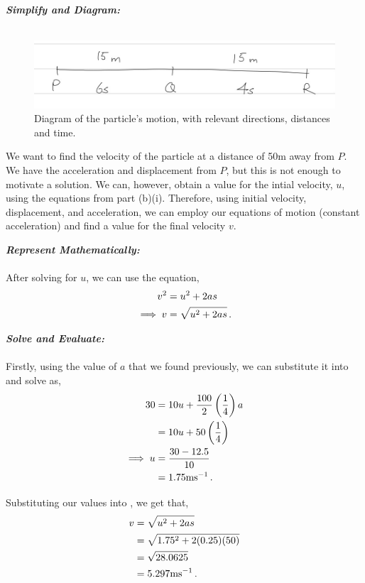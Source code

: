 \begin{subquestions}
\begin{subsubquestions}
\subsubquestion
\textbf{\textit{Simplify and Diagram:}} \\ \\
\begin{figure}[H]
	\begin{center}
		\includegraphics[scale=0.5]{../2010/figures/2010q5-2}
		\caption{\label{2010:q5:Move6} Diagram of the particle's motion, with relevant directions, distances and time.}
	\end{center}
\end{figure}
We want to find the velocity of the particle at a distance of 50m away from $P$. We have the acceleration and displacement from $P$, but this is not enough to motivate a solution. We can, however, obtain a value for the intial velocity, $u$, using the equations from part (b)(i). Therefore, using initial velocity, displacement, and acceleration, we can employ our equations of motion (constant acceleration) and find a value for the final velocity $v$.




\textbf{\textit{Represent Mathematically:}} \\ \\
After solving for $u$, we can use the equation,
\begin{align}
	v^2 & = u^2 + 2as \nonumber \\
	\implies v & = \sqrt{u^2+2as} \,. \label{2010:q5:MoveEqn5}
\end{align}




\textbf{\textit{Solve and Evaluate:}} \\ \\
Firstly, using the value of $a$ that we found previously, we can substitute it into  and solve as,
\begin{align}
	30 & = 10u + \frac{100}{2}\left(\frac{1}{4}\right)a \nonumber \\
	   & = 10u + 50\left(\frac{1}{4}\right) \nonumber \\
	   \implies u & = \frac{30-12.5}{10} \nonumber \\
	   & = 1.75 \text{ms}^{-1} \,.
\end{align}

Substituting our values into , we get that,
\begin{align}
	v & = \sqrt{u^2+2as} \nonumber \\
	  & = \sqrt{1.75^2+2(0.25)(50)} \nonumber \\
	  & = \sqrt{28.0625} \nonumber \\
	  & =  5.297 \text{ms}^{-1} \,.
\end{align}

\end{subsubquestions}
	
\end{subquestions}